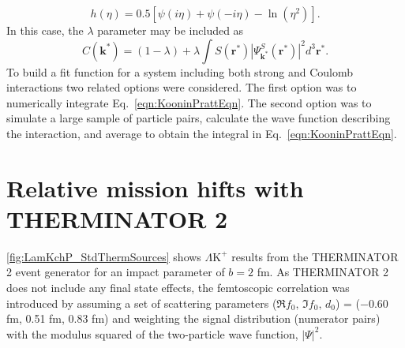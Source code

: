 \documentclass[ALICE,manyauthors]{cernphprep}
\newcommand{\LamKchP}{$\Lambda\mathrm{K^{+}}$\xspace}
\begin{document}
\begin{equation}
 h(\eta) = 0.5[\psi(i\eta) + \psi(-i\eta) - \ln(\eta^{2})].
\label{eqn:LednickyHFunction}
\end{equation} 
In this case, the $\lambda$ parameter may be included as
\begin{equation}
 C(\mathbf{k^{*}}) = (1 - \lambda) + \lambda\int S(\mathbf{r^{*}})|\Psi^{S}_{\mathbf{k^{*}}}(\mathbf{r^{*}})|^{2}d^{3}\mathbf{r^{*}}.
\label{eqn:GenCfEqnwLambda}
\end{equation}
To build a fit function for a system including both strong and Coulomb interactions two related options were considered. 
The first option was to numerically integrate Eq.~\ref{eqn:KooninPrattEqn}.  
The second option was to simulate a large sample of particle pairs, calculate the wave function describing the interaction, and average to obtain the integral in Eq.~\ref{eqn:KooninPrattEqn}. 
{\color{blue}{For this analysis, the latter option was adopted.}}


\section{Relative {\color{red}{E}}{\color{blue}{e}}mission {\color{red}{S}}{\color{blue}{s}}hifts with THERMINATOR 2}
\label{App:THERM}

{\color{red}{Fig.~}} {\color{blue}{Figure~}}\ref{fig:LamKchP_StdThermSources} shows \LamKchP results from the THERMINATOR 2 event generator for an impact parameter of $b = 2$ fm.
As THERMINATOR 2 does not include any final state effects, the femtoscopic correlation was introduced by assuming a set of scattering parameters ($\Re f_{0},\, \Im f_{0},\, d_{0}$) = ($-$0.60 fm, 0.51 fm, 0.83 fm) and weighting the signal distribution (numerator pairs) with the modulus squared of the two-particle wave function, $|\Psi|^{2}$.
\end{document}
